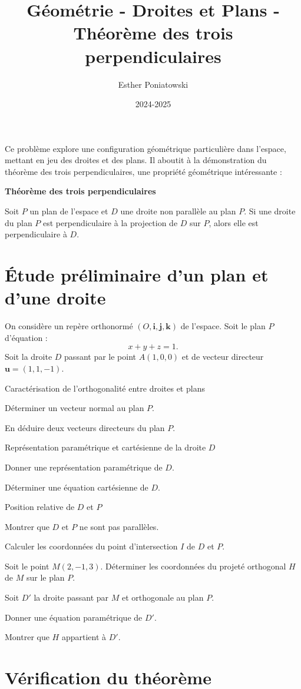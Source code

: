 \documentclass[10pt,a4paper]{article}
\title{Géométrie - Droites et Plans - Théorème des trois perpendiculaires}
\author{Esther Poniatowski}
\date{2024-2025}
\begin{document}
Ce problème explore une configuration géométrique particulière dans l'espace, mettant en jeu des
droites et des plans. Il aboutit à la démonstration du théorème des trois perpendiculaires, une
propriété géométrique intéressante :

\begin{center}
\textbf{Théorème des trois perpendiculaires}

Soit $P$ un plan de l'espace et $D$ une droite non parallèle au plan $P$. Si une droite du plan $P$ est
perpendiculaire à la projection de $D$ sur $P$, alors elle est perpendiculaire à $D$.
\end{center}

\section{Étude préliminaire d'un plan et d'une droite}

On considère un repère orthonormé $(O, \mathbf{i}, \mathbf{j}, \mathbf{k})$ de l'espace. Soit le
plan $P$ d'équation :
   \[
   x + y + z = 1.
   \]
Soit la droite $D$ passant par le point $A(1, 0, 0)$ et de vecteur directeur
$\mathbf{u} = (1,1,-1)$.

\q Caractérisation de l'orthogonalité entre droites et plans
\setcounter{ql}{0}

\ql Déterminer un vecteur normal au plan $P$.

\ql En déduire deux vecteurs directeurs du plan $P$.

\q Représentation paramétrique et cartésienne de la droite $D$
\setcounter{ql}{0}

\ql Donner une représentation paramétrique de $D$.

\ql Déterminer une équation cartésienne de $D$.

\q Position relative de $D$ et $P$
\setcounter{ql}{0}

\ql Montrer que $D$ et $P$ ne sont pas parallèles.

\ql Calculer les coordonnées du point d'intersection $I$ de $D$ et $P$.

\q Soit le point $M(2, -1, 3)$. Déterminer les coordonnées du projeté orthogonal $H$ de $M$ sur le
plan $P$.

\q Soit $D'$ la droite passant par $M$ et orthogonale au plan $P$.
\setcounter{ql}{0}

\ql Donner une équation paramétrique de $D'$.

\ql Montrer que $H$ appartient à $D'$.


\section{Vérification du théorème}
\end{document}
